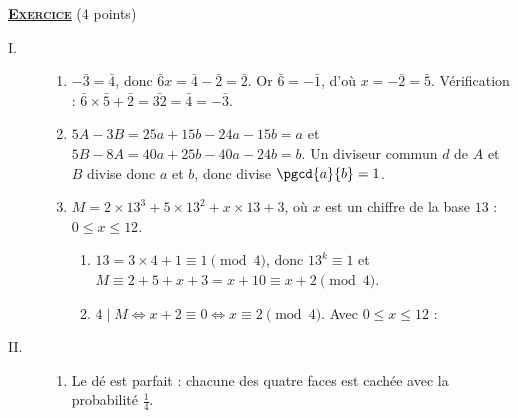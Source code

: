 \providecommand{\cm}{~\mathrm{cm}}
\providecommand{\dx}{~\mathrm{d}x}
\providecommand{\bary}[1]{\mathrm{bar}\left\lbrace #1 \right\rbrace}
\providecommand{\Angl}[2]{\left( \widehat{ \overrightarrow{#1} , \overrightarrow{#2} } \right)}
%
\noindent \underline{\textsc{\textbf{Exercice}}} (4 points)
\begin{description}
	\item[I.]
	\begin{enumerate}
		\item {}
			$-\bar{3} = \bar{4}$, donc $\bar{6}x = \bar{4} - \bar{2} = \bar{2}$. Or $\bar{6} = -\bar{1}$, d'où $x = -\bar{2} = \bar{5}$.
			Vérification : $\bar{6} \times \bar{5} + \bar{2} = \bar{32} = \bar{4} = -\bar{3}$.
			\par\noindent{}
		\item {}
			$5A - 3B = 25a + 15b - 24a - 15b = a$ et $5B - 8A = 40a + 25b - 40a - 24b = b$.
			Un diviseur commun $d$ de $A$ et $B$ divise donc $a$ et $b$, donc divise $\pgcd{a}{b} = 1$.
			\par\noindent{}
		\item $M = 2 \times 13^3 + 5 \times 13^2 + x \times 13 + 3$, où $x$ est un chiffre de la base $13$ : $0 \leq x \leq 12$.
		\begin{enumerate}
			\item {}
				$13 = 3 \times 4 + 1 \equiv 1 \pmod 4$, donc $13^k \equiv 1$ et $M \equiv 2 + 5 + x + 3 = x + 10 \equiv x + 2 \pmod 4$.
				\par\noindent{}
			\item {}
				$4 \mid M \iff x + 2 \equiv 0 \iff x \equiv 2 \pmod 4$. Avec $0 \leq x \leq 12$ :
				\par\noindent{}
		\end{enumerate}
	\end{enumerate}
	\item[II.]
	\begin{enumerate}
		\item Le dé est parfait : chacune des quatre faces est cachée avec la probabilité $\frac{1}{4}$.
		\begin{description}

\end{description}
\end{enumerate}
\end{description}
